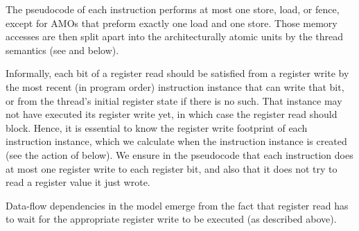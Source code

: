 The pseudocode of each instruction performs at most one store, load, or fence, except for AMOs that preform exactly one load and one store.
Those memory accesses are then split apart into the architecturally atomic units by the thread semantics (see  and  below).

Informally, each bit of a register read should be satisfied from a register write by the most recent (in program order) instruction instance that can write that bit, or from the thread's initial register state if there is no such.
That instance may not have executed its register write yet, in which case the register read should block.
Hence, it is essential to know the register write footprint of each instruction instance, which we calculate when the instruction instance is created (see the action of  below).
We ensure in the pseudocode that each instruction does at most one register write to each register bit, and also that it does not try to read a register value it just wrote.

Data-flow dependencies in the model emerge from the fact that register read has to wait for the appropriate register write to be executed (as described above).

